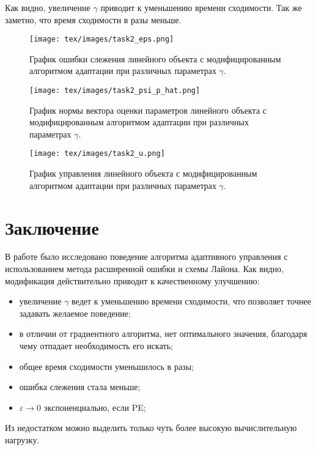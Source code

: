\documentclass{article}
\begin{document}
 Как видно, увеличение \(\gamma\) приводит к уменьшению времени сходимости. Так же заметно, что время сходимости в разы меньше.
\begin{figure}[h!]
  \centering
  \texttt{[image: tex/images/task2\_eps.png]}
  \caption{График ошибки слежения линейного объекта с модифицированным алгоритмом адаптации при различных параметрах \(\gamma\).} 
  \label{fig:2_epsilon}
\end{figure}
\begin{figure}[h!]
  \centering
  \texttt{[image: tex/images/task2\_psi\_p\_hat.png]}
  \caption{График нормы вектора оценки параметров линейного объекта с модифицированным алгоритмом адаптации при различных параметрах \(\gamma\).} 
  \label{fig:2_psi_p_hat_hat}
\end{figure}
\begin{figure}[h!]
  \centering
  \texttt{[image: tex/images/task2\_u.png]}
  \caption{График управления линейного объекта с модифицированным алгоритмом адаптации при различных параметрах \(\gamma\).} 
  \label{fig:2_u}
\end{figure}

\FloatBarrier
\newpage
\section{Заключение}
В работе было исследовано поведение алгоритма адаптивного управления с использованием метода расширенной ошибки и схемы Лайона. Как видно, модификация действительно приводит к качественному улучшению:
\begin{itemize}
  \item увеличение \(\gamma\) ведет к уменьшению времени сходимости, что позволяет точнее задавать желаемое поведение;
  \item в отличии от градиентного алгоритма, нет оптимального значения, благодаря чему отпадает необходимость его искать;
  \item общее время сходимости уменьшилось в разы;
  \item ошибка слежения стала меньше;
  \item \( \varepsilon \rightarrow 0 \) экспоненциально, если PE;
\end{itemize}
Из недостатком можно выделить только чуть более высокую вычислительную нагрузку.
\end{document}

